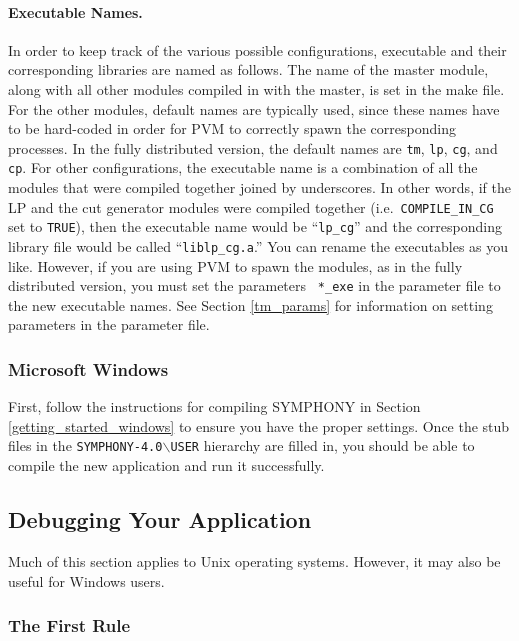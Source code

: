 \paragraph{Executable Names.}
\label{exe_names}
In order to keep track of the various possible configurations, executable and
their corresponding libraries are named as follows. The name of the master
module, along with all other modules compiled in with the master, is set in
the make file. For the other modules, default names are typically used, since
these names have to be hard-coded in order for PVM to correctly spawn the
corresponding processes.  In the fully distributed version, the default names
are \texttt{tm}, \texttt{lp}, \texttt{cg}, and \texttt{cp}. For other
configurations, the executable name is a combination of all the modules that
were compiled together joined by underscores. In other words, if the LP and
the cut generator modules were compiled together (i.e.~{\tt COMPILE\_IN\_CG}
set to {\tt TRUE}), then the executable name would be ``{\tt lp\_cg}'' and the
corresponding library file would be called ``{\tt liblp\_cg.a}.'' You can
rename the executables as you like. However, if you are using PVM to spawn the
modules, as in the fully distributed version, you must set the parameters {\tt
*\_exe} in the parameter file to the new executable names. See Section
\ref{tm_params} for information on setting parameters in the parameter file.

\subsubsection{Microsoft Windows}

First, follow the instructions for compiling SYMPHONY in Section
\ref{getting_started_windows} to ensure you have the proper settings. Once the
stub files in the {\tt SYMPHONY-4.0$\backslash$USER} hierarchy are
filled in, you should be able to compile the new application and run it
successfully. 

\subsection{Debugging Your Application}

Much of this section applies to Unix operating systems. However, it may
also be useful for Windows users.

\subsubsection{The First Rule}

